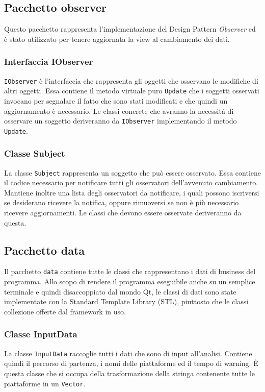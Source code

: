 	\subsection{Pacchetto observer}
		Questo pacchetto rappresenta l'implementazione del Design Pattern \textit{Observer} ed è stato utilizzato per tenere aggiornata la view al cambiamento dei dati.
		
		\subsubsection{Interfaccia IObserver}
		\texttt{IObserver} è l'interfaccia che rappresenta gli oggetti che osservano le modifiche di altri oggetti. Essa contiene il metodo virtuale puro \texttt{Update} che i soggetti osservati invocano per segnalare il fatto che sono stati modificati e che quindi un aggiornamento è necessario. Le classi concrete che avranno la necessità di osservare un soggetto deriveranno da \texttt{IObserver} implementando il metodo \texttt{Update}.
		
		\subsubsection{Classe Subject}
		La classe \texttt{Subject} rappresenta un soggetto che può essere osservato. Essa contiene il codice necessario per notificare tutti gli osservatori dell'avvenuto cambiamento. Mantiene inoltre una lista degli osservatori da notificare, i quali possono iscriversi se desiderano ricevere la notifica, oppure rimuoversi se non è più necessario ricevere aggiornamenti. Le classi che devono essere osservate deriveranno da questa.
	
	\subsection{Pacchetto data}
		Il pacchetto \texttt{data} contiene tutte le classi che rappresentano i dati di business del programma. Allo scopo di rendere il programma eseguibile anche su un semplice terminale e quindi disaccoppiato dal mondo Qt, le classi di dati sono state implementate con la Standard Template Library (STL), piuttosto che le classi collezione offerte dal framework in uso.
	
		\subsubsection{Classe InputData}
			La classe \texttt{InputData} raccoglie tutti i dati che sono di input all'analisi. Contiene quindi il percorso di partenza, i nomi delle piattaforme ed il tempo di warning. È questa classe che si occupa della trasformazione della stringa contenente tutte le piattaforme in un \texttt{Vector}.
				

